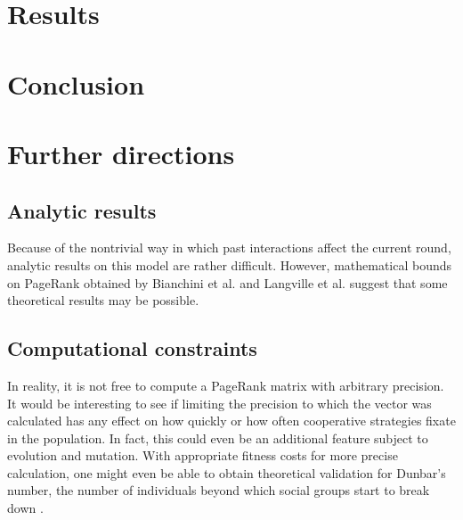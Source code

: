 \documentclass{amsart}
\begin{document}
\section{Results}
\label{sec:results}

\section{Conclusion}
\label{sec:conclusion}

\section{Further directions}

\subsection{Analytic results}

Because of the nontrivial way in which past interactions affect the
current round, analytic results on this model are rather
difficult. However, mathematical bounds on PageRank obtained by
Bianchini et al. \cite{bianchini_Inside_2005} and Langville et
al. \cite{langville_deeper_2004} suggest that some theoretical results
may be possible.

\subsection{Computational constraints}

In reality, it is not free to compute a PageRank matrix with arbitrary
precision. It would be interesting to see if limiting the precision to
which the vector was calculated has any effect on how quickly or how
often cooperative strategies fixate in the population. In fact, this
could even be an additional feature subject to evolution and
mutation. With appropriate fitness costs for more precise calculation,
one might even be able to obtain theoretical validation for Dunbar's
number, the number of individuals beyond which social groups start to
break down \cite{dunbar_neocortex_1995}.

 
\end{document}

